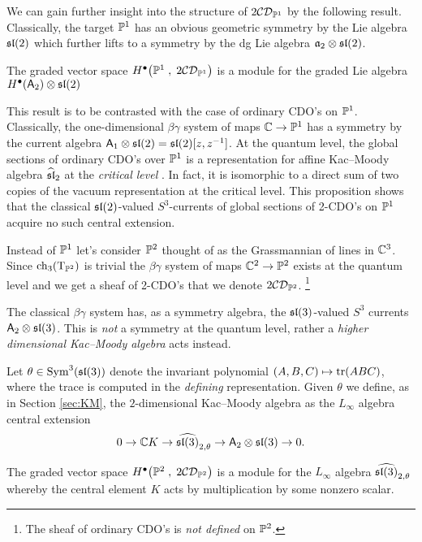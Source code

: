 \documentclass[11pt]{amsart}
\def\CDO{{\cC\cD}}
\begin{document}
We can gain further insight into the structure of $2\CDO_{\PP^1}$ by the following result. 
Classically, the target $\PP^1$ has an obvious geometric symmetry by the Lie algebra $\sl(2)$ which further lifts to a symmetry by the dg Lie algebra $\fa_2 \otimes \sl(2)$. 

\begin{prop}
The graded vector space $H^\bu \big(\PP^1 \; , \; 2 \CDO_{\PP^1}\big)$ is a module for the graded Lie algebra $H^\bu(\sfA_2) \otimes \sl(2)$
\end{prop}

\begin{rmk}
This result is to be contrasted with the case of ordinary CDO's on $\PP^1$. 
Classically, the one-dimensional $\beta\gamma$ system of maps $\CC \to \PP^1$ has a symmetry by the current algebra $\sfA_1 \otimes \sl(2) = \sl(2)[z,z^{-1}]$. 
At the quantum level, the global sections of ordinary CDO's over $\PP^1$ is a representation for affine Kac--Moody algebra $\Hat{\sl}_2$ at the {\em critical level} \cite[Theorem 5.7]{MSV}. 
In fact, it is isomorphic to a direct sum of two copies of the vacuum representation at the critical level.
This proposition shows that the classical $\sl(2)$-valued $S^3$-currents of global sections of 2-CDO's on $\PP^1$ acquire no such central extension. 
\end{rmk}

Instead of $\PP^1$ let's consider $\PP^2$ thought of as the Grassmannian of lines in $\CC^3$. 
Since $\ch_3(\T_{\PP^2})$ is trivial
the $\beta\gamma$ system of maps $\CC^2 \to \PP^2$ exists at the quantum level and we get a sheaf of 2-CDO's that we denote $2\CDO_{\PP^2}$. \footnote{The sheaf of ordinary CDO's is {\em not defined} on $\PP^2$.} 

The classical $\beta\gamma$ system has, as a symmetry algebra, the $\sl(3)$-valued $S^3$ currents $\sfA_2 \otimes \sl(3)$. 
This is {\em not} a symmetry at the quantum level, rather a {\em higher dimensional Kac--Moody algebra} acts instead.

Let $\theta \in {\rm Sym}^3(\sl(3))$ denote the invariant polynomial $(A,B,C) \mapsto {\rm tr}(ABC)$, where the trace is computed in the {\em defining} representation.
Given $\theta$ we define, as in Section \ref{sec:KM}, the $2$-dimensional Kac--Moody algebra as the $L_\infty$ algebra central extension
\[
0 \to \CC K \to \Hat{\sl(3)}_{2,\theta} \to \sfA_2 \otimes \sl(3) \to 0 .
\]

\begin{prop}
The graded vector space $H^\bu \big(\PP^2 \; , \; 2 \CDO_{\PP^2}\big)$ is a module for the $L_\infty$ algebra $\Hat{\sl(3)}_{2, \theta}$ whereby the central element $K$ acts by multiplication by some nonzero scalar. 
\end{prop}
\end{document}
